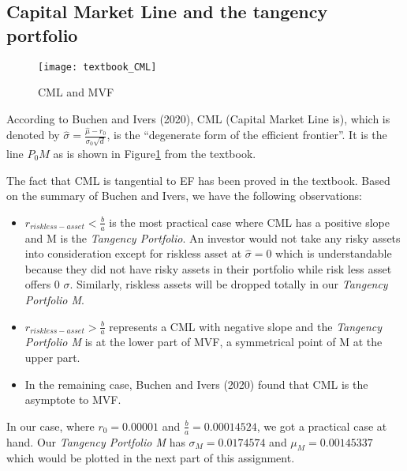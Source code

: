 \documentclass[
]{article}
\begin{document}
\hypertarget{capital-market-line-and-the-tangency-portfolio}{%
\subsection{Capital Market Line and the tangency
portfolio}\label{capital-market-line-and-the-tangency-portfolio}}

\label{CML and TP}

\begin{figure}[!htb]
\begin{center}
\texttt{[image: textbook\_CML]}
\end{center}
\caption{CML and MVF}\label{textbook_CML}
\end{figure}

According to Buchen and Ivers (2020), CML (Capital Market Line is),
which is denoted by
\(\hat\sigma = \frac{\hat\mu - r_0}{\sigma_0\sqrt{d}}\), is the
``degenerate form of the efficient frontier''. It is the line \(P_0M\)
as is shown in Figure\ref{textbook_CML} from the textbook.

The fact that CML is tangential to EF has been proved in the textbook.
Based on the summary of Buchen and Ivers, we have the following
observations:

\begin{itemize}
\item
  \(r_{riskless-asset} < \frac{b}{a}\) is the most practical case where
  CML has a positive slope and M is the \emph{Tangency Portfolio}. An
  investor would not take any risky assets into consideration except for
  riskless asset at \(\hat\sigma = 0\) which is understandable because
  they did not have risky assets in their portfolio while risk less
  asset offers 0 \(\sigma\). Similarly, riskless assets will be dropped
  totally in our \emph{Tangency Portfolio M}.
\item
  \(r_{riskless-asset} > \frac{b}{a}\) represents a CML with negative
  slope and the \emph{Tangency Portfolio M} is at the lower part of MVF,
  a symmetrical point of M at the upper part.
\item
  In the remaining case, Buchen and Ivers (2020) found that CML is the
  asymptote to MVF.
\end{itemize}

In our case, where \(r_0 = 0.00001\) and \(\frac{b}{a} = 0.00014524\),
we got a practical case at hand. Our \emph{Tangency Portfolio M} has
\(\sigma_M = 0.0174574\) and \(\mu_M = 0.00145337\) which would be
plotted in the next part of this assignment.
\end{document}
